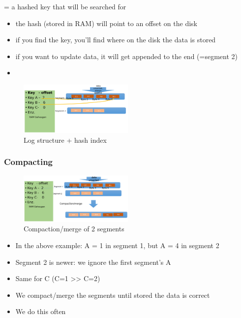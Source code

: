 \documentclass{article}
\begin{document}
= a hashed key that will be searched for

\begin{itemize}
    \item the hash (stored in RAM) will point to an offset on the disk
    \item if you find the key, you'll find where on the disk the data is stored
    \item if you want to update data, it will get appended to the end (=segment 2)
    \item 
\end{itemize}

\begin{figure}[H]
    \centering
    \includegraphics[width=0.5\textwidth]{key-value.png}
    \caption{Log structure + hash index}
\end{figure}

\subsubsection{Compacting}

\begin{figure}[H]
    \centering
    \includegraphics[width=0.5\textwidth]{key-value-compacting.png}
    \caption{Compaction/merge of 2 segments}
\end{figure}

\begin{itemize}
    \item In the above example: A = 1 in segment 1, but A = 4 in segment 2
    \item Segment 2 is newer: we ignore the first segment's A
    \item Same for C (C=1 >> C=2)
    \item We compact/merge the segments until stored the data is correct
    \item We do this often
\end{itemize}
\end{document}
